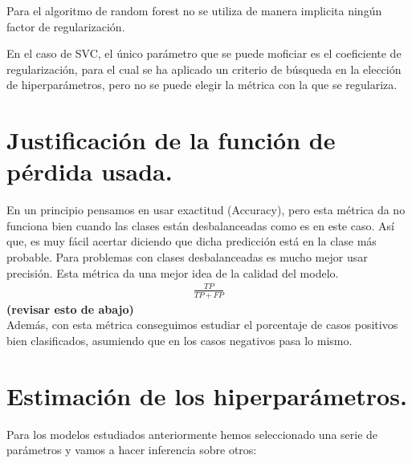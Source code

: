 \documentclass[a4paper,11pt]{article}
\begin{document}
Para el algoritmo de random forest no se utiliza de manera implicita ningún
factor de regularización.

En el caso de SVC, el único parámetro que se puede moficiar es el coeficiente de
regularización, para el cual se ha aplicado un criterio de búsqueda en la
elección de hiperparámetros, pero no se puede elegir la métrica con la que se
regulariza.


\section{Justificación de la función de pérdida usada.}

En un principio pensamos en usar exactitud (Accuracy), pero esta métrica da no funciona bien cuando las clases están desbalanceadas como es en este caso. Así que, es muy fácil acertar diciendo que dicha predicción está en la clase más probable. Para problemas con clases desbalanceadas es mucho mejor usar precisión. Esta métrica da una mejor idea de la calidad del modelo. 
\begin{align*}
\frac{TP}{TP+FP}
\end{align*}
\textbf{(revisar esto de abajo)}\\
Además, con esta métrica conseguimos estudiar el porcentaje de casos positivos bien clasificados, asumiendo que en los casos negativos pasa lo mismo.



\section{Estimación de los hiperparámetros.}


Para los modelos estudiados anteriormente hemos seleccionado una serie de
parámetros y vamos a hacer inferencia sobre otros:
\end{document}
